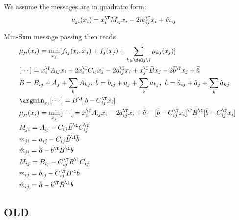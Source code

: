 We assume the messages are in quadratic form:
\begin{align}
&\mu_{ji}(x_i)
 = x_i^\T M_{ij} x_i - 2 m_{ij}^\T x_i + \hat m_{ij}
\end{align}

\newcommand{\+}{\myplus}
\renewcommand{\-}{\myminus}

Min-Sum message passing then reads
\begin{align}
&\mu_{ji}(x_i)
 = \min_{x_j} [f_{ij}(x_i,x_j) + f_j(x_j) + \sum_{k\in\del j\setminus i} \mu_{kj}(x_j)] \\
&[\cdots]
 = x_i^\T A_{ij} x_i + 2 x_i^\T C_{ij} x_j - 2 a_{ij}^\T x_i
  + x_j^\T \bar B x_j - 2 \bar b^\T x_j + \bar{\hat a} \\
& \bar B = B_{ij} + A_j + \sum_k A_{kj},~ \bar b=b_{ij} + a_j + \sum_k
a_{kj},~ \bar{\hat a}=\hat a_{ij} + \hat a_j + \sum_k \hat a_{kj} \\
&\argmin_{x_j}[\cdots]
 = \bar B^\1 [\bar b - C_{ij}^\T x_i] \\
&\mu_{ji}(x_i) = \min_{x_j}[\cdots]
 = x_i^\T A_{ij} x_i - 2 a_{ij}^\T x_i + \bar{\hat a}
  -[\bar b - C_{ij}^\T x_i]^\T \bar B^\1 [\bar b - C_{ij}^\T x_i] \\
& M_{ji} = A_{ij} - C_{ij} \bar B^\1 C_{ij}^\T \\
& m_{ji} = a_{ij} - C_{ij} \bar B^\1 \bar b \\
& \hat m_{ji} = \bar{\hat a} - \bar b^\T \bar B^\1 \bar b\\
& M_{ij} = B_{ij} - C_{ij}^\T \bar B^\1 C_{ij} \\
& m_{ij} = b_{ij} - C_{ij}^\T \bar B^\1 \bar b \\
& \hat m_{ij} = \bar{\hat a} - \bar b^\T \bar B^\1 \bar b
\end{align}



\subsection{OLD}


